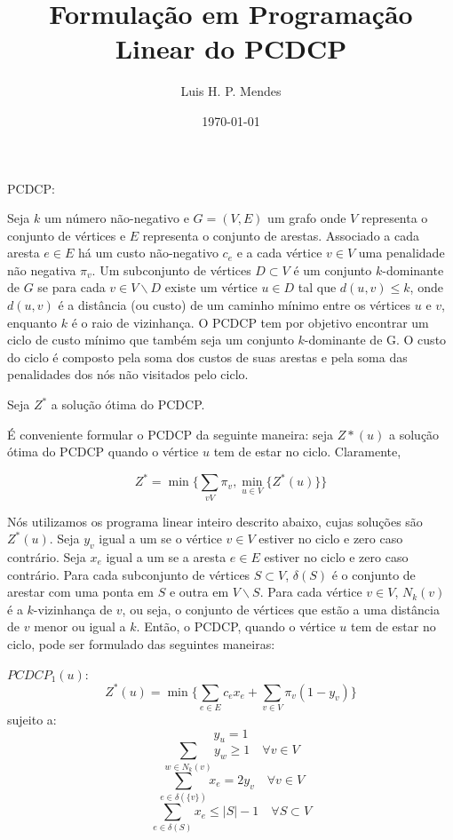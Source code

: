 \documentclass{article}
\title{ Formulação em Programação Linear do PCDCP }
\date{\today}
\author{Luis H. P. Mendes}
\begin{document}
	\maketitle
	
	PCDCP:
	
	Seja $k$ um número não-negativo e $G = (V, E)$ um grafo onde $V$ representa o conjunto de vértices e $E$ representa o conjunto de arestas.
	Associado a cada aresta $e \in E$ há um custo não-negativo $c_{e}$ e a cada vértice $v \in V$ uma penalidade não negativa $\pi_{v}$.
	Um subconjunto de vértices $D \subset V$ é um conjunto $k$-dominante de $G$ se para cada $v \in V \backslash D$ existe um vértice $u \in D$ tal que $d(u, v) \leq k$, onde $d(u, v)$ é a distância (ou custo) de um caminho mínimo entre os vértices $u$ e $v$, enquanto $k$ é o raio de vizinhança.
	O PCDCP tem por objetivo encontrar um ciclo de custo mínimo que também seja um conjunto $k$-dominante de G.
	O custo do ciclo é composto pela soma dos custos de suas arestas e pela soma das penalidades dos nós não visitados pelo ciclo.
	
	Seja $Z^*$ a solução ótima do PCDCP.
	
	É conveniente formular o PCDCP da seguinte maneira: seja $Z*(u)$ a solução ótima do PCDCP quando o vértice $u$ tem de estar no ciclo. Claramente,
	
	\begin{equation}
		Z^* = \min \Bigg\{ \sum_{v  V} \pi_v , \min_{u \in V} \Big\{ Z^*(u) \Big\}  \Bigg\}
	\end{equation}
	
	Nós utilizamos os programa linear inteiro descrito abaixo, cujas soluções são $Z^*(u)$. Seja $y_v$ igual a um se o vértice $v \in V$ estiver no ciclo e zero caso contrário.
	Seja $x_e$ igual a um se a aresta $e \in E$ estiver no ciclo e zero caso contrário. Para cada subconjunto de vértices $S \subset V$, $\delta(S)$ é o conjunto de arestar com uma ponta em $S$ e outra em $V \backslash S$.
	Para cada vértice $v \in V$, $N_k(v)$ é a $k$-vizinhança de $v$, ou seja, o conjunto de vértices que estão a uma distância de $v$ menor ou igual a $k$.
	Então, o PCDCP, quando o vértice $u$ tem de estar no ciclo, pode ser formulado das seguintes maneiras:

	$PCDCP_1(u)$:
	\begin{equation}
		Z^*(u) = \min \Bigg\{ \sum_{e \in E} c_e x_e + \sum_{v \in V} \pi_v (1 - y_v) \Bigg\}
	\end{equation}
	sujeito a:
	\begin{equation}
		y_u = 1
	\end{equation}
	\begin{equation}
		\sum_{w \in N_k(v)} y_w \geq 1 \quad \forall v \in V
	\end{equation}
	\begin{equation}
		\sum_{e \in \delta(\{v\})} x_e = 2y_v \quad \forall v \in V
	\end{equation}
	\begin{equation}
		\sum_{e \in \delta(S)} x_e \leq |S| - 1 \quad \forall S \subset V
	\end{equation}
	
\end{document}
